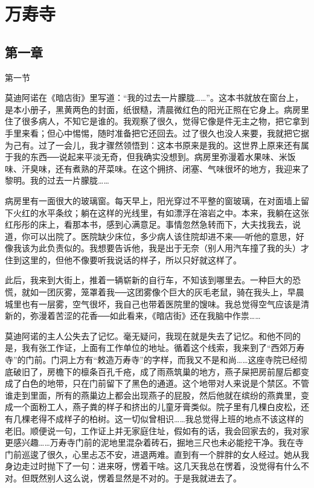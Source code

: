\chapter{万寿寺}

\section{第一章}

第一节 

莫迪阿诺在《暗店街》里写道：“我的过去一片朦胧……”。这本书就放在窗台上，是本小册子，黑黄两色的封面，纸很糙，清晨微红色的阳光正照在它身上。病房里住了很多病人，不知它是谁的。我观察了很久，觉得它像是件无主之物，把它拿到手里来看；但心中惕惕，随时准备把它还回去。过了很久也没人来要，我就把它据为己有。过了一会儿，我才骤然领悟到：这本书原来是我的。这世界上原来还有属于我的东西──说起来平淡无奇，但我确实没想到。病房里弥漫着水果味、米饭味、汗臭味，还有煮熟的芹菜味。在这个拥挤、闭塞、气味很坏的地方，我迎来了黎明。我的过去一片朦胧…… 

病房里有一面很大的玻璃窗。每天早上，阳光穿过不平整的窗玻璃，在对面墙上留下火红的水平条纹；躺在这样的光线里，有如漂浮在溶岩之中。本来，我躺在这张红彤彤的床上，看那本书，感到心满意足。事情忽然急转而下，大夫找我去，说道，你可以出院了。医院缺少床位，多少病人该住院却进不来──听他的意思，好像我该为此负责似的。我想要告诉他，我是出于无奈（别人用汽车撞了我的头）才住到这里的，但他不像要听我说话的样子，所以只好就这样了。 

此后，我来到大街上，推着一辆崭新的自行车，不知该到哪里去。一种巨大的恐慌，就如一团灰雾，笼罩着我──这团雾像个巨大的灰毛老鼠，骑在我头上，早晨城里也有一层雾，空气很坏，我自己也带着医院里的馊味。我总觉得空气应该是清新的，弥漫着苦涩的花香──如此看来，《暗店街》还在我脑中作祟…… 

莫迪阿诺的主人公失去了记忆。毫无疑问，我现在就是失去了记忆。和他不同的是，我有张工作证，上面有工作单位的地址。循着这个线索，我来到了“西郊万寿寺”的门前。门洞上方有“敕造万寿寺”的字样，而我又不是和尚……这座寺院已经彻底破旧了，房檐下的檩条百孔千疮，成了雨燕筑巢的地方，燕子屎把房前屋后都变成了白色的地带，只在门前留下了黑色的通道。这个地带对人来说是个禁区。不管谁走到里面，所有的燕巢边上都会出现燕子的屁股，然后他就在缤纷的燕粪里，变成一个面粉工人，燕子粪的样子和挤出的儿童牙膏类似。院子里有几棵白皮松，还有几棵老得不成样子的柏树。这一切似曾相识……我总觉得上班的地点不该这样的老旧。顺便说一句，工作证上并无家庭住址，假如有的话，我会回家去的，我对家更感兴趣……万寿寺门前的泥地里混杂着砖石，掘地三尺也未必能挖干净。我在寺门前巡逡了很久，心里忐忑不安，进退两难。直到有一个胖胖的女人经过。她从我身边走过时抛下了一句：进来呀，愣着干啥。这几天我总在愣着，没觉得有什么不对。但既然别人这么说，愣着显然是不对的。于是我就进去了。 

